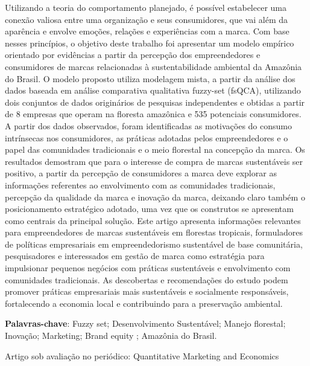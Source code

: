 \begin{resumoumacoluna}

Utilizando a teoria do comportamento planejado, é possível estabelecer uma conexão valiosa entre uma organização e seus consumidores, que vai além da aparência e envolve emoções, relações e experiências com a marca. Com base nesses princípios, o objetivo deste trabalho foi apresentar um modelo empírico orientado por evidências a partir da percepção dos empreendedores e consumidores de marcas relacionadas à sustentabilidade ambiental da Amazônia do Brasil. O modelo proposto utiliza modelagem mista, a partir da análise dos dados baseada em análise comparativa qualitativa fuzzy-set (fsQCA), utilizando dois conjuntos de dados originários de pesquisas independentes e obtidas a partir de 8 empresas que operam na floresta amazônica e 535 potenciais consumidores. A partir dos dados observados, foram identificadas as motivações do consumo intrínsecas nos consumidores, as práticas adotadas pelos empreendedores e o papel das comunidades tradicionais e o meio florestal na concepção da marca. Os resultados demostram que para o interesse de compra de marcas sustentáveis ser positivo, a partir da percepção de consumidores a marca deve explorar as informações referentes ao envolvimento com as comunidades tradicionais, percepção da qualidade da marca e inovação da marca, deixando claro também o posicionamento estratégico adotado, uma vez que os construtos se apresentam como centrais da principal solução. Este artigo apresenta informações relevantes para empreendedores de marcas sustentáveis em florestas tropicais, formuladores de políticas empresariais em empreendedorismo sustentável de base comunitária, pesquisadores e interessados em gestão de marca como estratégia para impulsionar pequenos negócios com práticas sustentáveis e envolvimento com comunidades tradicionais. As descobertas e recomendações do estudo podem promover práticas empresariais mais sustentáveis e socialmente responsáveis, fortalecendo a economia local e contribuindo para a preservação ambiental.
 \vspace{\onelineskip}
 
 \noindent
 \textbf{Palavras-chave}: Fuzzy set; Desenvolvimento Sustentável; Manejo florestal; Inovação; Marketing; Brand equity ; Amazônia do Brasil.

\noindent
Artigo sob avaliação no periódico: Quantitative Marketing and Economics




\end{resumoumacoluna}

